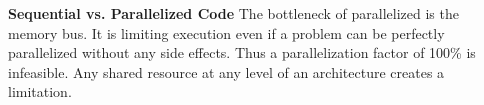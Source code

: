 \par{
	\noindent
	\textbf{Sequential vs. Parallelized Code} \newline
	The bottleneck of parallelized is the memory bus. It is limiting execution even if a problem can be perfectly parallelized without any side effects. Thus a parallelization factor of 100\% is infeasible. Any shared resource at any level of an architecture creates a limitation.
}

\par{
	\begin{center}
	\end{center}	
}
